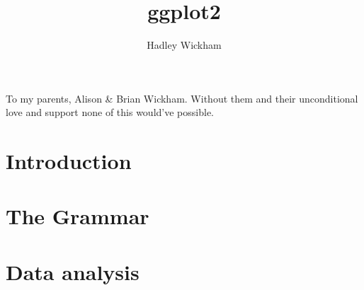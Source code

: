 \documentclass[graybox,envcountchap,sectrefs]{svmono}
\title{ggplot2}
\author{Hadley Wickham}
\begin{document}
\frontmatter
\maketitle

\begin{dedication}
To my parents, Alison \& Brian Wickham. Without them and their unconditional
love and support none of this would've possible.
\end{dedication}



\tableofcontents

\mainmatter

\part{Introduction}





\part{The Grammar}







\part{Data analysis}






\backmatter

\cleardoublepage
{}
\printindex

\printindex[code]
\end{document}
